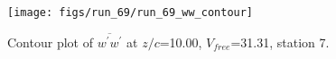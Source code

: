 \begin{figure}[H]
\centering
\texttt{[image: figs/run\_69/run\_69\_ww\_contour]}
\caption{Contour plot of $\overline{w^\prime w^\prime}$ at $z/c$=10.00, $V_{free}$=31.31, station 7.}
\end{figure}


